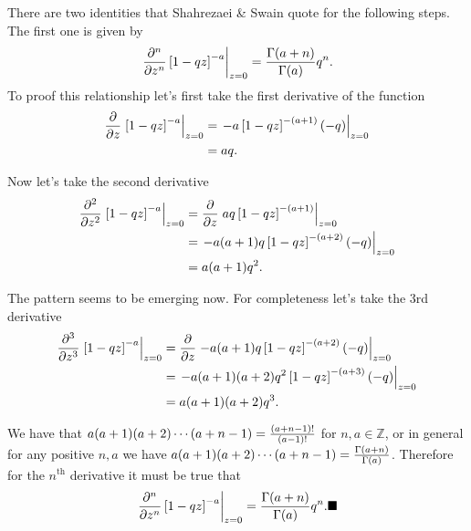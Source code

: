 There are two identities that Shahrezaei \& Swain quote for the following steps.
The first one is given by
\begin{equation}
    \left. {\partial ^n \over \partial z^n}
    \left[ 1 - q z \right]^{-a} \right\vert _{z=0} =
    {\Gamma(a + n) \over \Gamma(a)} q^n.
\end{equation}
To proof this relationship let's first take the first derivative of the function
\begin{align}
  {\partial \over \partial z}
  \left. \left[ 1 - q z \right]^{-a} \right\vert _{z=0}
  &= \left. -a \left[ 1 - q z \right]^{-(a + 1)} (-q) \right\vert _{z=0}\\
  &= a q.
\end{align}

Now let's take the second derivative
\begin{align}
  {\partial^2 \over \partial z^2}
  \left. \left[ 1 - q z \right]^{-a} \right\vert _{z=0}
  &= {\partial \over \partial z}
  \left. a q \left[ 1 - q z \right]^{-(a + 1)} \right\vert _{z=0}\\
  &= \left. -a (a + 1) q \left[ 1 - q z \right]^{-(a + 2)} (-q)
  \right\vert _{z=0} \\
  &= a(a + 1) q^2.
\end{align}

The pattern seems to be emerging now. For completeness let's take the 3rd
derivative
\begin{align}
  {\partial^3 \over \partial z^3}
  \left. \left[ 1 - q z \right]^{-a} \right\vert _{z=0}
  &= {\partial \over \partial z}
  \left. -a (a + 1) q \left[ 1 - q z \right]^{-(a + 2)} (-q)
  \right\vert _{z=0} \\
  &= \left. -a (a + 1) (a + 2) q^2
  \left[ 1 - q z \right]^{-(a + 3)} (-q) \right\vert _{z=0} \\
  &= a(a + 1) (a + 2) q^3.
\end{align}

We have that $a (a + 1) (a + 2) \cdots (a + n - 1) = {(a + n - 1)! \over (a -
1)!}$ for $n, a \in \mathbb{Z}$, or in general for any positive $n, a$ we have
$a (a + 1) (a + 2) \cdots (a + n - 1) = {\Gamma(a + n) \over \Gamma(a)}$.
Therefore for the $n^{\text{th}}$ derivative it must be true that
\begin{equation}
    \left. {\partial ^n \over \partial z^n}
    \left[ 1 - q z \right]^{-a} \right\vert _{z=0} =
    {\Gamma(a + n) \over \Gamma(a)} q^n. \blacksquare
    \label{eq_derivative_identity}
\end{equation}

